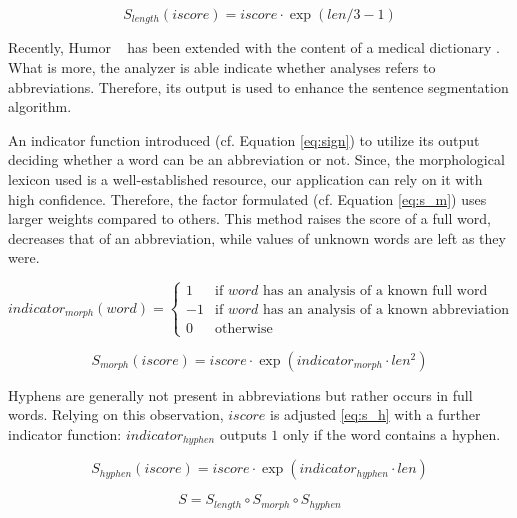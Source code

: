 \begin{equation} \label{eq:s_l}
S_{length}(iscore)= iscore \cdot \exp{(len/3-1)}
\end{equation}

Recently, Humor ~\cite{Proszeky1994,Novak2003,Proszeky2005}  has been extended with the content of a medical dictionary \cite{Orosz2013}. 
What is more, the analyzer is able indicate whether analyses refers to abbreviations.
Therefore, its output is used to enhance the sentence segmentation algorithm.  

An indicator function introduced (cf. Equation \ref{eq:sign}) to utilize its output deciding whether a word can be an abbreviation or not.
Since, the morphological lexicon used is a well-established resource, our application can rely on it with high confidence.
Therefore, the factor formulated (cf. Equation \ref{eq:s_m}) uses larger weights compared to others. 
This method raises the score of a full word, decreases that of an abbreviation, while values of unknown words are left as they were.

\begin{equation}\label{eq:sign}
 indicator_{morph}(word) =
  \begin{cases}
   1  & \text{if $word$ has an analysis of a known full word} \\
   -1 & \text{if $word$ has an analysis of a known abbreviation} \\
   0  & \text{otherwise}
  \end{cases}
\end{equation}

\begin{equation} \label{eq:s_m}
S_{morph}(iscore)= iscore \cdot \exp{( indicator_{morph} \cdot len^2)}
\end{equation}

Hyphens are generally not present in abbreviations but rather occurs in full words. 
Relying on this observation, $iscore$ is adjusted \eqref{eq:s_h} with a further indicator function:
$indicator_{hyphen}$ outputs $1$ only if the word contains a hyphen. 

\begin{equation} \label{eq:s_h}
S_{hyphen}(iscore)= iscore \cdot \exp{(indicator_{hyphen} \cdot len)}
\end{equation}

\begin{equation} \label{eq:scaling}
S = S_{length} \circ S_{morph} \circ S_{hyphen}
\end{equation}


